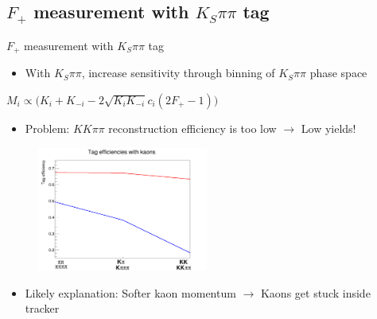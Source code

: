 \documentclass{beamer}
\begin{document}
\subsection{\texorpdfstring{$F_+$}{F+} measurement with \texorpdfstring{$K_S\pi\pi$}{KSpipi} tag}

\begin{frame}{$F_+$ measurement with $K_S\pi\pi$ tag}
  \begin{itemize}
    \item{With $K_S\pi\pi$, increase sensitivity through binning of $K_S\pi\pi$ phase space}
  \end{itemize}
  \begin{center}
    $M_i\propto\big(K_i + K_{-i} - 2\sqrt{K_iK_{-i}}c_i(2F_+ - 1)\big)$
  \end{center}
  \begin{itemize}
    \item{Problem: $KK\pi\pi$ reconstruction efficiency is too low $\to$ Low yields!}
  \end{itemize}
  \begin{figure}
    \includegraphics[width = 0.5\textwidth]{Plots/KaonTrackingEfficiency.png}
  \end{figure}
  \begin{itemize}
    \item{Likely explanation: Softer kaon momentum $\to$ Kaons get stuck inside tracker}
  \end{itemize}
\end{frame}
\end{document}
